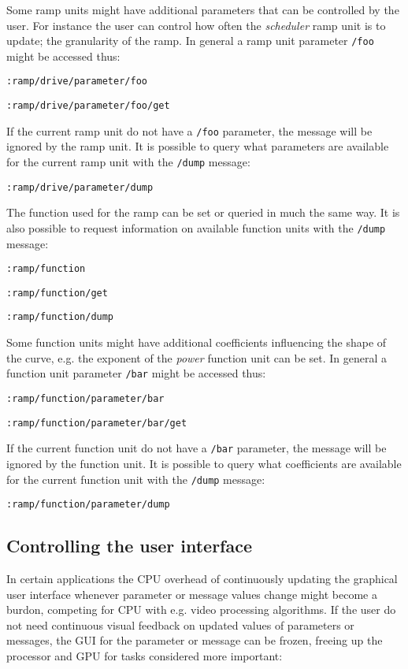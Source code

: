 \documentclass{sig-alternate}
\begin{document}
Some ramp units might have additional parameters that can be controlled by the user. For instance the user can control how often the \emph{scheduler} ramp unit is to update; the granularity of the ramp.  In general a ramp unit parameter \texttt{/foo} might be accessed thus:


\texttt{:ramp/drive/parameter/foo}

\texttt{:ramp/drive/parameter/foo/get}

If the current ramp unit do not have a \texttt{/foo} parameter, the message will be ignored by the ramp unit. It is possible to query what parameters are available for the current ramp unit with the \texttt{/dump} message:

\texttt{:ramp/drive/parameter/dump}

The function used for the ramp can be set or queried in much the same way. It is also possible to request information on available function units with the \texttt{/dump} message:

\texttt{:ramp/function}

\texttt{:ramp/function/get}

\texttt{:ramp/function/dump}

Some function units might have additional coefficients influencing the shape of the curve, e.g. the exponent of the \emph{power} function unit can be set. In general a function unit parameter \texttt{/bar} might be accessed thus:

\texttt{:ramp/function/parameter/bar}

\texttt{:ramp/function/parameter/bar/get}

If the current function unit do not have a \texttt{/bar} parameter, the message will be ignored by the function unit. It is possible to query what coefficients are available for the current function unit with the \texttt{/dump} message:

\texttt{:ramp/function/parameter/dump}





\subsection{Controlling the user interface} %
\label{sub:controlling_the_user_interface}

In certain applications the CPU overhead of continuously updating the graphical user interface whenever parameter or message values change might become a burdon, competing for CPU with e.g. video processing algorithms. If the user do not need continuous visual feedback on updated values of parameters or messages, the GUI for the parameter or message can be frozen, freeing up the processor and GPU for tasks considered more important:
\end{document}
